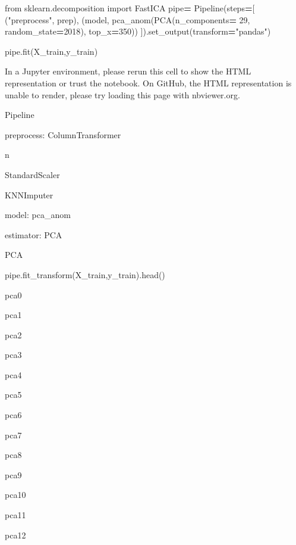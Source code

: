 \documentclass[
]{article}
\newenvironment{Shaded}{\begin{snugshade}}{\end{snugshade}}
\newcommand{\DecValTok}[1]{\textcolor[rgb]{0.00,0.00,0.81}{#1}}
\newcommand{\ImportTok}[1]{#1}
\newcommand{\NormalTok}[1]{#1}
\newcommand{\OperatorTok}[1]{\textcolor[rgb]{0.81,0.36,0.00}{\textbf{#1}}}
\newcommand{\StringTok}[1]{\textcolor[rgb]{0.31,0.60,0.02}{#1}}
\begin{document}
\begin{Shaded}
\begin{Highlighting}[]
\ImportTok{from}\NormalTok{ sklearn.decomposition }\ImportTok{import}\NormalTok{ FastICA}
\NormalTok{pipe}\OperatorTok{=}\NormalTok{ Pipeline(steps}\OperatorTok{=}\NormalTok{[}
\NormalTok{    (}\StringTok{"preprocess"}\NormalTok{, prep),    }
\NormalTok{    (}\StringTok{\textquotesingle{}model\textquotesingle{}}\NormalTok{, pca\_anom(PCA(n\_components}\OperatorTok{=} \DecValTok{29}\NormalTok{, random\_state}\OperatorTok{=}\DecValTok{2018}\NormalTok{), top\_x}\OperatorTok{=}\DecValTok{350}\NormalTok{))        }
\NormalTok{    ]).set\_output(transform}\OperatorTok{=}\StringTok{"pandas"}\NormalTok{)}

\NormalTok{pipe.fit(X\_train,y\_train)}
\end{Highlighting}
\end{Shaded}

\hypertarget{sk-container-id-1}{}
In a Jupyter environment, please rerun this cell to show the HTML
representation or trust the notebook. On GitHub, the HTML representation
is unable to render, please try loading this page with nbviewer.org.

Pipeline

preprocess: ColumnTransformer

n

StandardScaler

KNNImputer

model: pca\_anom

estimator: PCA

PCA

\begin{Shaded}
\begin{Highlighting}[]
\NormalTok{pipe.fit\_transform(X\_train,y\_train).head()}
\end{Highlighting}
\end{Shaded}

pca0

pca1

pca2

pca3

pca4

pca5

pca6

pca7

pca8

pca9

pca10

pca11

pca12
\end{document}
